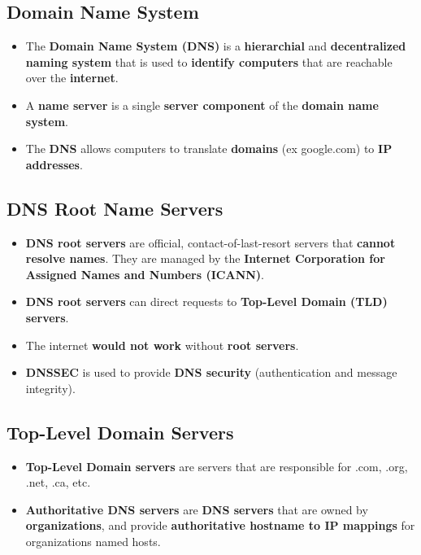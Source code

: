 \documentclass[16pt]{article}
\begin{document}
    \subsection*{Domain Name System}
    \begin{itemize}
        \item The \textbf{Domain Name System (DNS)} is a \textbf{hierarchial} and \textbf{decentralized naming system} that is used to \textbf{identify computers} that are reachable over the \textbf{internet}.
        \item A \textbf{name server} is a single \textbf{server component} of the \textbf{domain name system}.
        \item The \textbf{DNS} allows computers to translate \textbf{domains} (ex google.com) to \textbf{IP addresses}. 
    \end{itemize}

    \subsection*{DNS Root Name Servers}
    \begin{itemize}
        \item \textbf{DNS root servers} are official, contact-of-last-resort servers that \textbf{cannot resolve names}. They are managed by the \textbf{Internet Corporation for Assigned Names and Numbers (ICANN)}.
        \item \textbf{DNS root servers} can direct requests to \textbf{Top-Level Domain (TLD) servers}.
        \item The internet \textbf{would not work} without \textbf{root servers}.
        \item \textbf{DNSSEC} is used to provide \textbf{DNS security} (authentication and message integrity).
    \end{itemize}

    \subsection*{Top-Level Domain Servers}
    \begin{itemize}
        \item \textbf{Top-Level Domain servers} are servers that are responsible for .com, .org, .net, .ca, etc.
        \item \textbf{Authoritative DNS servers} are \textbf{DNS servers} that are owned by \textbf{organizations}, and provide \textbf{authoritative hostname to IP mappings} for organizations named hosts.
    \end{itemize}
\end{document}
